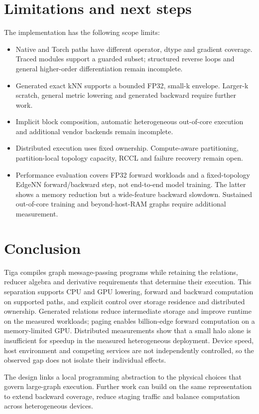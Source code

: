 \section{Limitations and next steps}
The implementation has the following scope limits:
\begin{itemize}
\item Native and Torch paths have different operator, dtype and gradient coverage.
Traced modules support a guarded subset; structured reverse loops and general
higher-order differentiation remain incomplete.
\item Generated exact kNN supports a bounded FP32, small-k envelope. Larger-k
scratch, general metric lowering and generated backward require further work.
\item Implicit block composition, automatic heterogeneous out-of-core execution
and additional vendor backends remain incomplete.
\item Distributed execution uses fixed ownership. Compute-aware partitioning,
partition-local topology capacity, RCCL and failure recovery remain open.
\item Performance evaluation covers FP32 forward workloads and a fixed-topology
EdgeNN forward/backward step, not end-to-end model training. The latter shows a
memory reduction but a wide-feature backward slowdown. Sustained out-of-core training
and beyond-host-RAM graphs require additional measurement.
\end{itemize}

\section{Conclusion}
Tiga compiles graph message-passing programs while retaining the relations,
reducer algebra and derivative requirements that determine their execution.
This separation supports CPU and GPU lowering, forward and backward computation
on supported paths, and explicit control over storage residence and distributed
ownership. Generated relations reduce intermediate storage and improve runtime
on the measured workloads; paging enables billion-edge forward computation on
a memory-limited GPU. Distributed measurements show that a small halo alone is
insufficient for speedup in the measured heterogeneous deployment. Device speed,
host environment and competing services are not independently controlled, so
the observed gap does not isolate their individual effects.

The design links a local programming abstraction to the physical choices that
govern large-graph execution. Further work can build on the same representation
to extend backward coverage, reduce staging traffic and balance computation
across heterogeneous devices.
